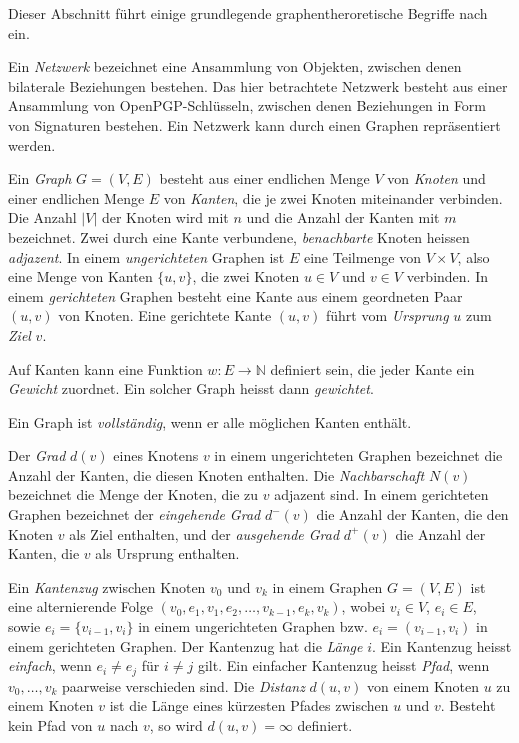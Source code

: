 Dieser Abschnitt f\"uhrt einige grundlegende graphentheroretische
Begriffe nach \cite{Brandes2004} ein.
  
Ein \emph{Netzwerk} bezeichnet eine Ansammlung von Objekten, zwischen
denen bilaterale Beziehungen bestehen. Das hier betrachtete Netzwerk
besteht aus einer Ansammlung von OpenPGP-Schl\"usseln, zwischen denen
Beziehungen in Form von Signaturen bestehen. Ein Netzwerk kann durch einen
Graphen repr\"asentiert werden.

Ein \emph{Graph} $G=(V, E)$ besteht aus einer endlichen Menge $V$ von
\emph{Knoten} und einer endlichen Menge $E$ von \emph{Kanten}, die je
zwei Knoten miteinander verbinden. Die Anzahl $|V|$ der Knoten wird mit
$n$ und die Anzahl der Kanten mit $m$ bezeichnet. Zwei durch eine
Kante verbundene, \emph{benachbarte} Knoten heissen
\emph{adjazent}. In einem \emph{ungerichteten} Graphen ist $E$ eine
Teilmenge von $V\times V$, also eine Menge von Kanten $\{u, v\}$, die
zwei Knoten $u \in V$ und $v\in V$ verbinden. In einem
\emph{gerichteten} Graphen besteht eine Kante aus einem geordneten
Paar $(u, v)$ von Knoten. Eine gerichtete Kante $(u, v)$ f\"uhrt vom
\emph{Ursprung} $u$ zum \emph{Ziel} $v$.

Auf Kanten kann eine Funktion $w: E \rightarrow \mathbb{N}$ definiert
sein, die jeder Kante ein \emph{Gewicht} zuordnet. Ein solcher Graph
heisst dann \emph{gewichtet}.

Ein Graph ist \emph{vollst\"andig}, wenn er alle m\"oglichen Kanten
enth\"alt.

Der \emph{Grad} $d(v)$ eines Knotens $v$ in einem ungerichteten
Graphen bezeichnet die Anzahl der Kanten, die diesen Knoten
enthalten. Die \emph{Nachbarschaft} $N(v)$ bezeichnet die Menge der
Knoten, die zu $v$ adjazent sind. In einem gerichteten Graphen
bezeichnet der \emph{eingehende Grad} $d^{-}(v)$ die Anzahl der
Kanten, die den Knoten $v$ als Ziel enthalten, und der
\emph{ausgehende Grad} $d^{+}(v)$ die Anzahl der Kanten, die $v$ als
Ursprung enthalten.

Ein \emph{Kantenzug} zwischen Knoten $v_0$ und $v_k$ in einem Graphen
$G=(V, E)$ ist eine alternierende Folge $(v_0, e_1, v_1, e_2, \dots,
v_{k-1}, e_k, v_k)$, wobei $v_i \in V$, $e_i \in E$, sowie $e_i =
\{v_{i-1}, v_{i}\}$ in einem ungerichteten Graphen bzw. $e_i =
(v_{i-1}, v_{i})$ in einem gerichteten Graphen. Der Kantenzug hat die
\emph{L\"ange} $i$. Ein Kantenzug heisst \emph{einfach}, wenn $e_i \ne
e_j$ f\"ur $i \ne j$ gilt.  Ein einfacher Kantenzug heisst
\emph{Pfad}, wenn $v_0, \dots, v_k$ paarweise verschieden sind. Die
\emph{Distanz} $d(u, v)$ von einem Knoten $u$ zu einem Knoten $v$ ist die
L\"ange eines k\"urzesten Pfades zwischen $u$ und $v$. Besteht kein
Pfad von $u$ nach $v$, so wird $d(u,v) = \infty$ definiert.


